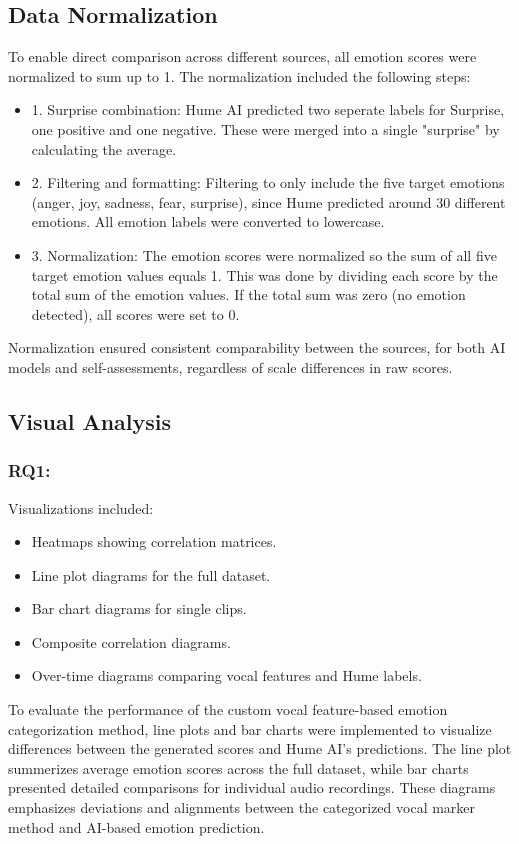 \subsection{Data Normalization}
To enable direct comparison across different sources, all emotion scores were normalized to sum up to 1. The normalization included the following steps: 
\begin{itemize}
    \item 1. Surprise combination: Hume AI predicted two seperate labels for Surprise, one positive and one negative. These were merged into a single "surprise" by calculating the average. 
    \item 2. Filtering and formatting: Filtering to only include the five target emotions (anger, joy, sadness, fear, surprise), since Hume predicted around 30 different emotions. All emotion labels were converted to lowercase. 
    \item 3. Normalization: The emotion scores were normalized so the sum of all five target emotion values equals 1. This was done by dividing each score by the total sum of the emotion values. If the total sum was zero (no emotion detected), all scores were set to 0. 
\end{itemize}
Normalization ensured consistent comparability between the sources, for both AI models and self-assessments, regardless of scale differences in raw scores. 
\subsection{Visual Analysis}
\subsubsection{RQ1:}
Visualizations included: 
\begin{itemize}
    \item Heatmaps showing correlation matrices.
    \item Line plot diagrams for the full dataset. 
    \item Bar chart diagrams for single clips. 
    \item Composite correlation diagrams. 
    \item Over-time diagrams comparing vocal features and Hume labels. 
\end{itemize}
To evaluate the performance of the custom vocal feature-based emotion categorization method, line plots and bar charts were implemented to visualize differences between the generated scores and Hume AI's predictions. 
The line plot summerizes average emotion scores across the full dataset, while bar charts presented detailed comparisons for individual audio recordings. 
These diagrams emphasizes deviations and alignments between the categorized vocal marker method and AI-based emotion prediction. 

